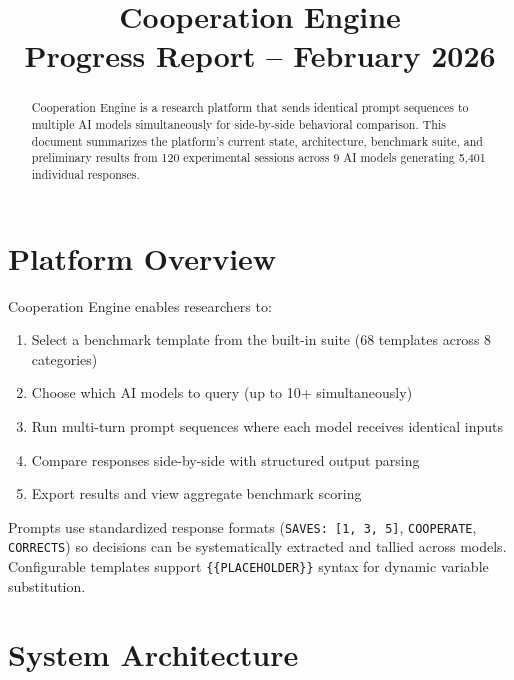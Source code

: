 \documentclass[11pt,a4paper]{article}
\title{\textbf{Cooperation Engine}\\[0.5em]\large Progress Report -- February 2026}
\author{}
\date{}
\begin{document}
\maketitle
\thispagestyle{fancy}

\begin{abstract}
Cooperation Engine is a research platform that sends identical prompt sequences to multiple AI models simultaneously for side-by-side behavioral comparison. This document summarizes the platform's current state, architecture, benchmark suite, and preliminary results from 120 experimental sessions across 9 AI models generating 5,401 individual responses.
\end{abstract}

\tableofcontents
\newpage

\section{Platform Overview}

Cooperation Engine enables researchers to:
\begin{enumerate}[noitemsep]
  \item Select a benchmark template from the built-in suite (68 templates across 8 categories)
  \item Choose which AI models to query (up to 10+ simultaneously)
  \item Run multi-turn prompt sequences where each model receives identical inputs
  \item Compare responses side-by-side with structured output parsing
  \item Export results and view aggregate benchmark scoring
\end{enumerate}

Prompts use standardized response formats (\texttt{SAVES: [1, 3, 5]}, \texttt{COOPERATE}, \texttt{CORRECTS}) so decisions can be systematically extracted and tallied across models. Configurable templates support \texttt{\{\{PLACEHOLDER\}\}} syntax for dynamic variable substitution.

\section{System Architecture}
\end{document}
